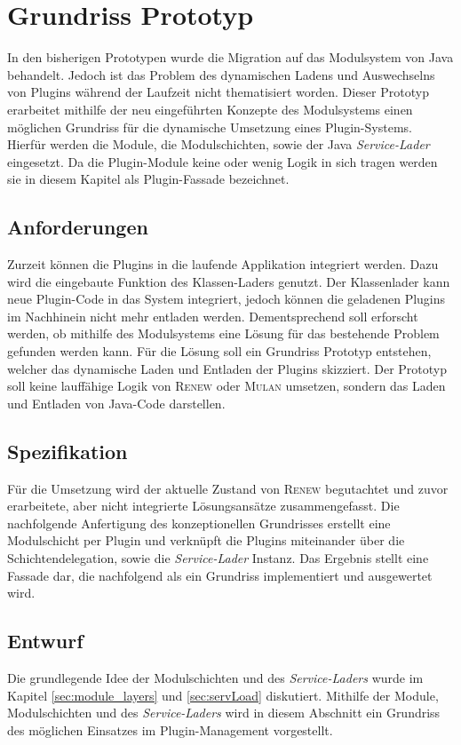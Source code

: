 \chapter{Grundriss Prototyp} \label{ch:grRiss}
	In den bisherigen Prototypen wurde die Migration auf das Modulsystem von Java behandelt. Jedoch ist das Problem des dynamischen Ladens und Auswechselns von Plugins während der Laufzeit nicht thematisiert worden. Dieser Prototyp erarbeitet mithilfe der neu eingeführten Konzepte des Modulsystems einen möglichen Grundriss für die dynamische Umsetzung eines Plugin-Systems. Hierfür werden die Module, die Modulschichten, sowie der Java \textit{Service-Lader} eingesetzt. Da die Plugin-Module keine oder wenig Logik in sich tragen werden sie in diesem Kapitel als Plugin-Fassade bezeichnet.

\section{Anforderungen} 
	Zurzeit können die Plugins in die laufende Applikation integriert werden. Dazu wird die eingebaute Funktion des Klassen-Laders genutzt. Der Klassenlader kann neue Plugin-Code in das System integriert, jedoch können die geladenen Plugins im Nachhinein nicht mehr entladen werden. Dementsprechend soll erforscht werden, ob mithilfe des Modulsystems eine Lösung für das bestehende Problem gefunden werden kann. Für die Lösung soll ein Grundriss Prototyp entstehen, welcher das dynamische Laden und Entladen der Plugins skizziert. Der Prototyp soll keine lauffähige Logik von \textsc{Renew} oder \textsc{Mulan} umsetzen, sondern das Laden und Entladen von Java-Code darstellen.

\section{Spezifikation} 
	Für die Umsetzung wird der aktuelle Zustand von \textsc{Renew} begutachtet und zuvor erarbeitete, aber nicht integrierte Lösungsansätze zusammengefasst. Die nachfolgende Anfertigung des konzeptionellen Grundrisses erstellt eine Modulschicht per Plugin und verknüpft die Plugins miteinander über die Schichtendelegation, sowie die \textit{Service-Lader} Instanz. Das Ergebnis stellt eine Fassade dar, die nachfolgend als ein Grundriss implementiert und ausgewertet wird.

\section{Entwurf} \label{sec:entwurf}
	Die grundlegende Idee der Modulschichten und des \textit{Service-Laders} wurde im Kapitel \ref{sec:module_layers} und \ref{sec:servLoad} diskutiert. Mithilfe der Module, Modulschichten und des \textit{Service-Laders} wird in diesem Abschnitt ein Grundriss des möglichen Einsatzes im Plugin-Management vorgestellt. \bigbreak

